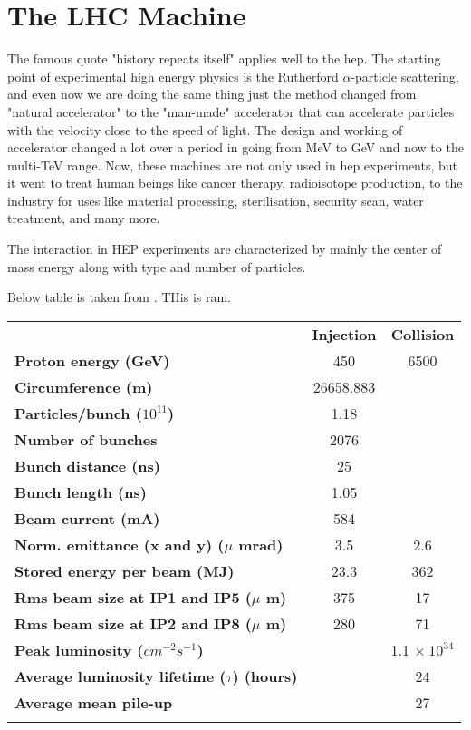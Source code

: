 \chapter{The LHC Machine}

The famous quote "history repeats itself" applies well to the \acrfull{hep}. The starting point of experimental high energy physics is the Rutherford $\alpha$-particle scattering, and even now we are doing the same thing just the method changed from "natural accelerator" to the "man-made" accelerator that can accelerate particles with the velocity close to the speed of light. The design and working of accelerator changed a lot over a period in going from MeV to GeV and now to the multi-TeV range. Now, these machines are not only used in \acrshort{hep} experiments, but it went to treat human beings like cancer therapy, radioisotope production,  to the industry for uses like material processing, sterilisation, security scan, water treatment, and many more. 


The interaction in HEP experiments are characterized by mainly the center of mass energy along with type and number of particles.


Below table is taken from \cite{Schoerner-Sadenius2015, LHC-parameters-2016, LHC-tdr}. THis is ram.


\begin{tabularx}{\textwidth}{|l c c|}
    \hhline{---}
    {\bf } \cellcolor[gray]{.8}& {\bf Injection} \cellcolor[gray]{.8}& {\bf Collision}\cellcolor[gray]{.8} \\
    \hhline{---}
    {\bf Proton energy (GeV)} & 450 & 6500\\
    \hhline{---}
    {\bf Circumference (m)} &  26658.883 & \\
    \hhline{---}
    {\bf Particles/bunch ($10^{11}$)}& 1.18 &  \\
    \hhline{---}
    {\bf Number of bunches} &   2076 &  \\
    \hhline{---}
    {\bf Bunch distance (ns)}   &  25 &   \\
    \hhline{---}
    {\bf Bunch length (ns)} &    1.05 & \\
    \hhline{---}
    {\bf Beam current (mA)} &   584 &   \\
    \hhline{---}
    {\bf Norm. emittance (x and y) ($\mu$ mrad)}  &  3.5 &  2.6 \\
    \hhline{---}
    {\bf Stored energy per beam (MJ)}   &  23.3 &  362 \\
    \hhline{---}
    {\bf Rms beam size at IP1 and IP5 ($\mu$ m)}  &  375 &  17 \\
    \hhline{---}
    {\bf Rms beam size at IP2 and IP8 ($\mu$ m)}  &  280 &  71 \\
    \hhline{---}
    {\bf Peak luminosity ($cm^{-2}s^{-1}$)}   &   & 1.1 $\times ~ 10^{34}$  \\
    \hhline{---}
    {\bf Average luminosity lifetime ($\tau$) (hours)} &    &   24 \\
    \hhline{---}
    {\bf Average mean pile-up}  &   &   27  \\
    \hhline{---}
\end{tabularx}

